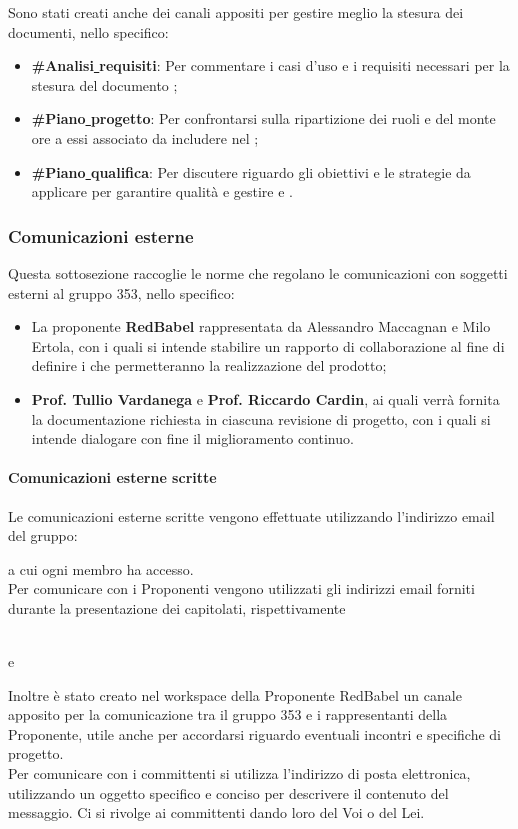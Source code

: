 \documentclass[NormeDiProgetto.tex]{subfiles}
\begin{document}
	Sono stati creati anche dei canali appositi per gestire meglio la stesura dei documenti, nello specifico:
	\begin{itemize}
		\item \textbf{\#Analisi\underline{ }requisiti}: Per commentare i casi d'uso e i requisiti necessari per la stesura del documento \adr;
		\item \textbf{\#Piano\underline{ }progetto}: Per confrontarsi sulla ripartizione dei ruoli e del monte ore a essi associato da includere nel \pdp;
		\item \textbf{\#Piano\underline{ }qualifica}: Per discutere riguardo gli obiettivi e le strategie da applicare per garantire qualità e gestire  e .
	\end{itemize}
	

	\subsubsection{Comunicazioni esterne}
	Questa sottosezione raccoglie le norme che regolano le comunicazioni con soggetti esterni al gruppo 353, nello specifico:
	\begin{itemize}
		\item La proponente \textbf{RedBabel} rappresentata da Alessandro Maccagnan e Milo Ertola, con i quali si intende stabilire un rapporto di collaborazione al fine di definire i  che permetteranno la realizzazione del prodotto;
		\item \textbf{Prof. Tullio Vardanega} e \textbf{Prof. Riccardo Cardin}, ai quali verrà fornita la documentazione richiesta in ciascuna revisione di progetto, con i quali si intende dialogare con fine il miglioramento continuo.
	\end{itemize}
	\paragraph{Comunicazioni esterne scritte}
	Le comunicazioni esterne scritte vengono effettuate utilizzando l'indirizzo email del gruppo:
	\begin{center}
		\mailgroup
	\end{center}
	a cui ogni membro ha accesso.\\
	Per comunicare con i Proponenti vengono utilizzati gli indirizzi email forniti durante la presentazione dei capitolati, rispettivamente 
	\begin{center}
		 \\
		e\\
		
	\end{center}
	Inoltre è stato creato nel workspace  della Proponente RedBabel un canale apposito per la comunicazione tra il gruppo 353 e i rappresentanti della Proponente, utile anche per accordarsi riguardo eventuali incontri e specifiche di progetto.\\
	Per comunicare con i committenti si utilizza l'indirizzo di posta elettronica, utilizzando un oggetto specifico e conciso per descrivere il contenuto del messaggio. Ci si rivolge ai committenti dando loro del Voi o del Lei.
	
\end{document}
